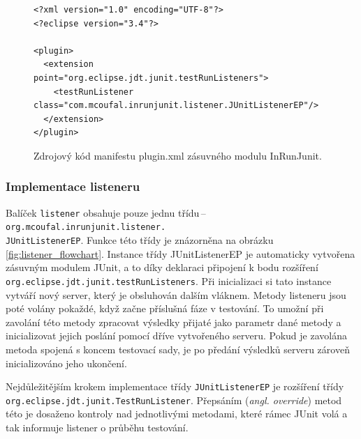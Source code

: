 	\lstset{language=xml}
	\begin{figure}[h]
	  \begin{lstlisting}[frame=single]
<?xml version="1.0" encoding="UTF-8"?>
<?eclipse version="3.4"?>

<plugin>
  <extension point="org.eclipse.jdt.junit.testRunListeners">
    <testRunListener class="com.mcoufal.inrunjunit.listener.JUnitListenerEP"/>
  </extension>
</plugin>
	  \end{lstlisting}
	  \caption{Zdrojový kód manifestu plugin.xml zásuvného modulu InRunJunit.}
	  \label{code:plugin.xml}
	\end{figure}
     
      \subsubsection{Implementace listeneru}
	Balíček \texttt{listener} obsahuje pouze jednu třídu\,--\,\texttt{org.\-mcoufal.inrunjunit.listener.\\JUnitListenerEP}. Funkce této třídy je znázorněna na obrázku \ref{fig:listener_flowchart}. Instance třídy JUnitListenerEP je automaticky vytvořena zásuvným modulem JUnit, a to díky deklaraci připojení k bodu rozšíření \texttt{org.eclipse.jdt.junit.testRunListeners}. Při inicializaci si tato instance vytváří nový server, který je obsluhován dalším vláknem. Metody listeneru jsou poté volány pokaždé, když začne příslušná fáze v testování. To umožní při zavolání této metody zpracovat výsledky přijaté jako parametr dané metody a inicializovat jejich poslání pomocí dříve vytvořeného serveru. Pokud je zavolána metoda spojená s koncem testovací sady, je po předání výsledků serveru zároveň inicializováno jeho ukončení.
	
	Nejdůležitějším krokem implementace třídy \texttt{JUnitListenerEP} je rozšíření třídy \texttt{org.eclipse.jdt.junit.TestRunListener}. Přepsáním (\emph{angl. override}) metod této je dosaženo kontroly nad jednotlivými metodami, které rámec JUnit volá a tak informuje listener o průběhu testování.
	
